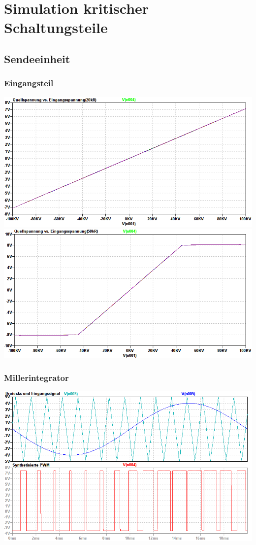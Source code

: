 \section{Simulation kritischer Schaltungsteile}
\subsection{Sendeeinheit}
\subsubsection{Eingangsteil}
\includegraphics[scale=0.5]{gfx/simTx/Impedance20k.png}
\includegraphics[scale=0.5]{gfx/simTx/Impedance50k.png}

\subsubsection{Millerintegrator}
\begin{float}
\centering
\includegraphics[scale=0.5]{gfx/simTx/PWMsynth.png}
\end{float}
